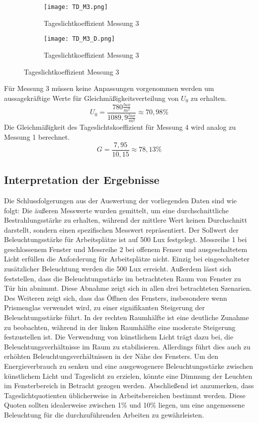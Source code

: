   \begin{figure}[H]
  \centering
  \begin{subfigure}[c]{0.5\textwidth}
      \texttt{[image: TD\_M3.png]}
      \caption{Tageslichtkoeffizient Messung 3}
      \label{fig:Tageslichtkoeffizient Messung 3}
  \end{subfigure}
  \hfill
  \begin{subfigure}[c]{0.45\textwidth}
      \texttt{[image: TD\_M3\_D.png]}
      \caption{Tageslichtkoeffizient Messung 3}
      \label{fig:Tageslichtkoeffizient Messung 3 Draufsicht}
  \end{subfigure}
  \label{fig:Messung 3 Tageslichtkoeffizient}
  \end{figure}
Für Messung 3 müssen keine Anpassungen vorgenommen werden um aussagekräftige Werte für Gleichmäßigkeitsverteilung von $U_0$ zu erhalten.
  $$U_0 = \frac{780\frac{lux}{m^2}}{1089,9\frac{lux}{m^2}}\approx 70,98\%$$
  Die Gleichmäßigkeit des Tageslichtskoeffizient für Messung 4 wird analog zu Messung 1 berechnet.
  $$G = \frac{7,95}{10,15}\approx 78,13\%$$
\newpage
\subsection{Interpretation der Ergebnisse}
Die Schlussfolgerungen aus der Auswertung der vorliegenden Daten sind wie folgt: Die äußeren Messwerte wurden gemittelt, um eine durchschnittliche Bestrahlungsstärke zu erhalten, während der mittlere Wert keinen Durchschnitt darstellt, sondern einen spezifischen Messwert repräsentiert.
Der Sollwert der Beleuchtungsstärke für Arbeitsplätze ist auf 500 Lux festgelegt. Messreihe 1 bei geschlossenem Fenster und Messreihe 2 bei offenem Fenser und ausgeschaltetem Licht erfüllen die Anforderung für Arbeitsplätze nicht. Einzig bei eingeschalteter zusätzlicher Beleuchtung werden die 500 Lux erreicht.
Außerdem lässt sich feststellen, dass die Beleuchtungsstärke im betrachteten Raum von Fenster zu Tür hin abnimmt. Diese Abnahme zeigt sich in allen drei betrachteten Szenarien.
Des Weiteren zeigt sich, dass das Öffnen des Fensters, insbesondere wenn Prismenglas verwendet wird, zu einer signifikanten Steigerung der Beleuchtungsstärke führt. In der rechten Raumhälfte ist eine deutliche Zunahme zu beobachten, während in der linken Raumhälfte eine moderate Steigerung festzustellen ist.
Die Verwendung von künstlichem Licht trägt dazu bei, die Beleuchtungsverhältnisse im Raum zu stabilisieren. Allerdings führt dies auch zu erhöhten Beleuchtungsverhältnissen in der Nähe des Fensters. Um den Energieverbrauch zu senken und eine ausgewogenere Beleuchtungsstärke zwischen künstlichem Licht und Tageslicht zu erzielen, könnte eine Dimmung der Leuchten im Fensterbereich in Betracht gezogen werden.
Abschließend ist anzumerken, dass Tageslichtquotienten üblicherweise in Arbeitsbereichen bestimmt werden. Diese Quoten sollten idealerweise zwischen 1\% und 10\% liegen, um eine angemessene Beleuchtung für die durchzuführenden Arbeiten zu gewährleisten.